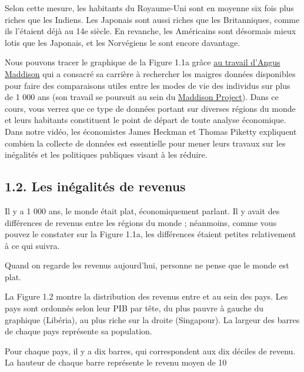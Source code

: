 \documentclass[11pt]{amsart}
\begin{document}
Selon cette mesure, les habitants du Royaume-Uni sont en moyenne six fois plus riches que les Indiens. Les Japonais sont aussi riches que les Britanniques, comme ils l’étaient déjà au 14e siècle. En revanche, les Américains sont désormais mieux lotis que les Japonais, et les Norvégiens le sont encore davantage.


Nous pouvons tracer le graphique de la Figure 1.1a grâce \href{https://tinyco.re/4376799}{au travail d’Angus Maddison} qui a consacré sa carrière à rechercher les maigres données disponibles pour faire des comparaisons utiles entre les modes de vie des individus sur plus de 1 000 ans (son travail se poursuit au sein du \href{https://tinyco.re/9843804}{Maddison Project}). Dans ce cours, vous verrez que ce type de données portant sur diverses régions du monde et leurs habitants constituent le point de départ de toute analyse économique. Dans notre vidéo, les économistes James Heckman et Thomas Piketty expliquent combien la collecte de données est essentielle pour mener leurs travaux sur les inégalités et les politiques publiques visant à les réduire.



\hypertarget{x-1.2.-les-inégalités-de-revenus}{\subsection*{1.2. Les inégalités de revenus}}
Il y a 1 000 ans, le monde était plat, économiquement parlant. Il y avait des différences de revenus entre les régions du monde ; néanmoins, comme vous pouvez le constater sur la Figure 1.1a, les différences étaient petites relativement à ce qui suivra.


Quand on regarde les revenus aujourd’hui, personne ne pense que le monde est plat.


La Figure 1.2 montre la distribution des revenus entre et au sein des pays. Les pays sont ordonnés selon leur PIB par tête, du plus pauvre à gauche du graphique (Libéria), au plus riche sur la droite (Singapour). La largeur des barres de chaque pays représente sa population.


Pour chaque pays, il y a dix barres, qui correspondent aux dix déciles de revenu. La hauteur de chaque barre représente le revenu moyen de 10 %
\end{document}

